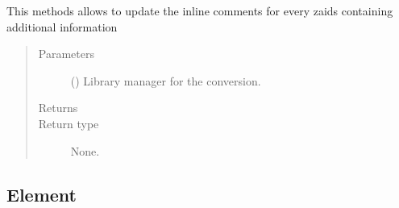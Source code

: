 \documentclass[letterpaper,10pt,english]{sphinxmanual}
\begin{document}
\begin{fulllineitems}
\begin{fulllineitems}
\end{fulllineitems}


\begin{fulllineitems}
\label{\detokenize{api/inputgeneration:matreader.SubMaterial.update_info}}
\sphinxAtStartPar
This methods allows to update the in\sphinxhyphen{}line comments for every zaids
containing additional information
\begin{quote}\begin{description}
\item[{Parameters}] \leavevmode
\sphinxAtStartPar
{} ({\hyperref[\detokenize{api/initobjects:libmanager.LibManager}]{}}) \textendash{} Library manager for the conversion.

\item[{Returns}] \leavevmode
\sphinxAtStartPar


\item[{Return type}] \leavevmode
\sphinxAtStartPar
None.

\end{description}\end{quote}

\end{fulllineitems}


\end{fulllineitems}



\subsection{Element}
\label{\detokenize{api/inputgeneration:element}}
\end{document}
